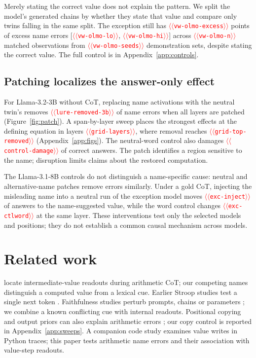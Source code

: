 \documentclass[11pt]{article}
\providecommand{\NUM}[1]{\textcolor{red}{$\langle\langle$\texttt{#1}$\rangle\rangle$}}
\begin{document}
Merely stating the correct value does not explain the pattern. We split the model's generated
chains by whether they state that value and compare only twins falling in the same split.
The exception still has \NUM{vw-olmo-excess} points of excess name errors
[\NUM{vw-olmo-lo}, \NUM{vw-olmo-hi}] across \NUM{vw-olmo-n} matched observations from
\NUM{vw-olmo-seeds} demonstration sets, despite stating the correct value. The full control is
in Appendix~\ref{app:controls}.

\subsection{Patching localizes the answer-only effect}

For Llama-3.2-3B without CoT, replacing name activations with the neutral twin's removes
\NUM{lure-removed-3b} of name errors when all layers are patched (Figure~\ref{fig:patch}).
A span-by-layer sweep places the strongest effects at the
defining equation in layers \NUM{grid-layers}, where removal reaches \NUM{grid-top-removed}
(Appendix~\ref{app:figs}). The neutral-word control also damages \NUM{control-damage} of correct
answers. The patch identifies a region sensitive to the name; disruption limits claims about the restored computation.

The Llama-3.1-8B controls do not distinguish a name-specific cause: neutral and alternative-name
patches remove errors similarly. Under a gold CoT, injecting the misleading name into a neutral
run of the exception model moves \NUM{exc-inject} of answers to the name-suggested value, while the word control
changes \NUM{exc-ctlword} at the same layer. These interventions test only the selected models and positions; they do not establish a common causal mechanism across models.



\section{Related work}

\citet{kudo2026faithful} locate intermediate-value readouts during arithmetic CoT; our competing
names distinguish a computed value from a lexical cue. Earlier Stroop studies test a single next
token \cite{wang2026stroop,hu2026conflict}. Faithfulness studies perturb prompts, chains or
parameters \cite{turpin2023unfaithful,lanham2023measuring,chen2025reasoning,tutek2025unlearning};
we combine a known conflicting cue with internal readouts. Positional copying and output priors
can also explain arithmetic errors \cite{liu2026readout,prabhakar2024deciphering}; our copy
control is reported in Appendix~\ref{app:sweeps}.
A companion code study \citep{anon2026code} examines value writes in Python traces; this
paper tests arithmetic name errors and their association with value-step readouts.
\end{document}
